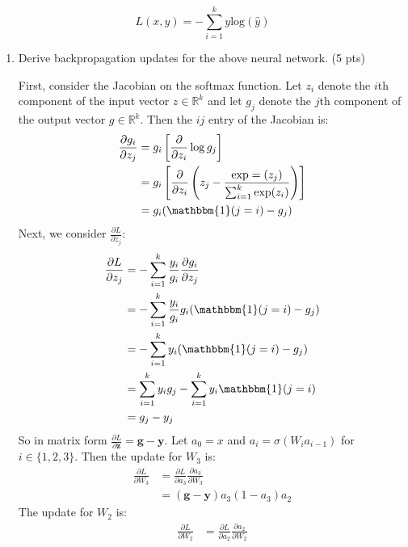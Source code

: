 \documentclass[a4paper]{article}
\theoremstyle{definition}
\newenvironment{soln}{
    \leavevmode\color{blue}\ignorespaces
}{}
\begin{document}
\[
L(x, y) = -\sum_{i=1}^k y \text{log}(\hat{y})
\]

\begin{enumerate}
    \item Derive backpropagation updates for the above neural network. (5 pts)
    
    \begin{soln}
        First, consider the Jacobian on the softmax function.
        Let $z_i$ denote the $i$th component of the input vector $z \in \mathbb{R}^{k}$ and let $g_j$ denote the $j$th component of the output vector $g \in \mathbb{R}^{k}$. Then the $ij$ entry of the Jacobian is:
        $$
        \begin{aligned}
            \frac{\partial g_i}{\partial z_j} & = g_i \left[\frac{\partial}{\partial z_i} \log g_j \right] \\
            & = g_i \left[ \frac{\partial}{\partial z_i} \left(z_j - \frac{\exp=(z_j)}{\sum_{i=1}^{k} \exp(z_i)}\right) \right] \\
            & = g_i (\mathbbm{1}(j = i) - g_j)
        \end{aligned}
        $$
        Next, we consider $\frac{\partial L}{\partial z_j}$:
        $$
        \begin{aligned}
            \frac{\partial L}{\partial z_j} & = -\sum_{i = 1}^{k} \frac{y_i}{g_i} \frac{\partial g_i}{\partial z_j} \\
            & = -\sum_{i = 1}^{k} \frac{y_i}{g_i} g_i (\mathbbm{1}(j = i) - g_j) \\
            & = -\sum_{i = 1}^{k} y_i (\mathbbm{1}(j = i) - g_j) \\
            & = \sum_{i = 1}^{k} y_i g_j - \sum_{i = 1}^{k} y_i \mathbbm{1}(j = i) \\
            & = g_j - y_j
        \end{aligned}
        $$
        So in matrix form $\frac{\partial L}{\partial \mathbf{z}} = \mathbf{g} - \mathbf{y}$. Let $a_0 = x$ and $a_i = \sigma(W_i a_{i-1})$ for $i \in \{1, 2, 3\}$. Then the update for $W_3$ is:
        $$
        \begin{aligned}
            \frac{\partial L}{\partial W_3} & = \frac{\partial L}{\partial a_3} \frac{\partial a_3}{\partial W_3} \\
            & = (\mathbf{g} - \mathbf{y}) a_3 (1 - a_3) a_2
        \end{aligned}
        $$
        The update for $W_2$ is:
        $$
        \begin{aligned}
            \frac{\partial L}{\partial W_2} & = \frac{\partial L}{\partial a_2} \frac{\partial a_2}{\partial W_2} \\

\end{aligned}$$
\end{soln}
\end{enumerate}
\end{document}
